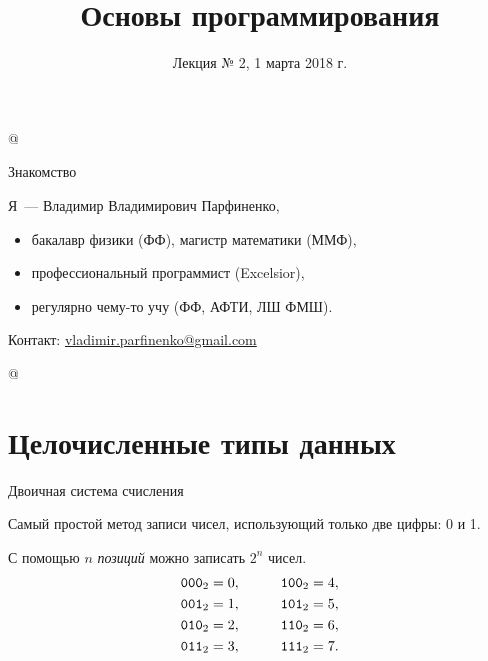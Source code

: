 %





\title{Основы программирования}
\subtitle{Лекция № 2, 1 марта 2018 г.}
\date{}




\lstMakeShortInline[style=inlineC]@

\begin{frame}[plain]
  \titlepage
\end{frame}

\lstDeleteShortInline@
\begin{frame}{Знакомство}

  Я~--- Владимир Владимирович Парфиненко,

  \begin{itemize}
    \item бакалавр физики (ФФ), магистр математики (ММФ),
    \item профессиональный программист (Excelsior),
    \item регулярно чему-то учу (ФФ, АФТИ, ЛШ ФМШ).
  \end{itemize}


  Контакт:
  \href{mailto:vladimir.parfinenko@gmail.com}{vladimir.parfinenko@gmail.com}

\end{frame}
\lstMakeShortInline[style=inlineC]@

\section{Целочисленные типы данных}

\begin{frame}{Двоичная система счисления}

  Самый простой метод записи чисел, использующий только две цифры: 0 и 1.

  С помощью $n$ \emph{позиций} можно записать $2^n$ чисел.
  \begin{align*}
    \mathtt{000}_2 &= 0, &\qquad \mathtt{100}_2 &= 4, \\
    \mathtt{001}_2 &= 1, &\qquad \mathtt{101}_2 &= 5, \\
    \mathtt{010}_2 &= 2, &\qquad \mathtt{110}_2 &= 6, \\
    \mathtt{011}_2 &= 3, &\qquad \mathtt{111}_2 &= 7.
  \end{align*}

\end{frame}

